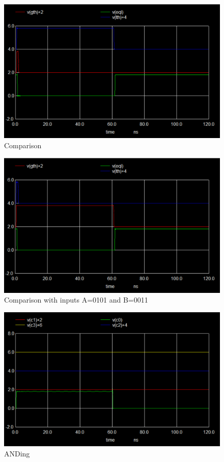 \documentclass[a4paper, titlepage]{article}
\begin{document}
\begin{figure}[htp!]
    \centering
    \hypertarget{MC1}{\includegraphics[scale = 0.5]{4_bit_C_10.png}}
    \caption{Comparison}
    \label{fig:fig19}
\end{figure}
\begin{figure}[htp!]
    \centering
    \hypertarget{MC2}{\includegraphics[scale = 0.5]{4_bit_C_10_diffIn.png}}
    \caption{Comparison with inputs A=0101 and B=0011}
    \label{fig:fig20}
\end{figure}
\begin{figure}[htp!]
    \centering
    \hypertarget{MAnd}{\includegraphics[scale = 0.5]{4_bit_AND_11.png}}
    \caption{ANDing}
    \label{fig:fig21}
\end{figure} \newline 
\end{document}
